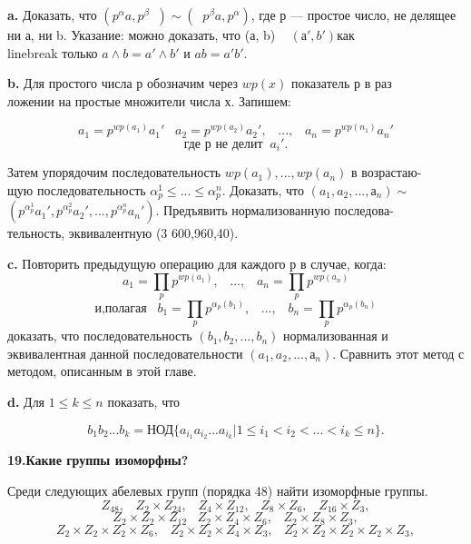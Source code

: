 {\bf a.} Доказать, что $ (p^{\alpha}a,p^{\beta}\;\;)\sim(\;\;p^{\beta}a,p^{\alpha}) $, где р — простое число, не 
делящее ни а, ни b. Указание: можно доказать, что (а, b) ~ $(а', b')$как\\linebreak 
только $a\wedge b = a'\wedge b'$ и $ab = a'b'$. 

\medskip


{\bf b.} Для простого числа р обозначим через $ wp(x)$ показатель р в 
раз\\ложении на простые множители числа х. Запишем: 


$$a_1=p^{ wp(a_1)}a_1'\;\;\;a_2=p^{ wp(a_2)}a_2',\;\;\;...,\;\;\;a_n=p^{ wp(n_1)}a_n'$$ 
$$\text{где р не делит}\;\;a_i'. $$



Затем упорядочим последовательность $ wp(a_1),..., wp(a_n)$ в 
возрастаю-\\
щую последовательность $ \alpha^1_p\leqslant...\leqslant\alpha^n_p $. Доказать, что $(a_1, a_2,..., а_n)\sim$\\
$(p^{\alpha_p^1}a_1',p^{\alpha_p^2}a_2',...,p^{\alpha_p^n}a_n') $. Предъявить нормализованную 
последова-\\тельность, эквивалентную (3 600,960,40). 

\medskip

{\bf c.} Повторить предыдущую операцию для каждого р в случае, когда: 
$$\displaystyle a_1=\prod_pp^{ wp(a_1)},\;\;\;...,\;\;\; a_n=\prod_p p^{ wp(a_n)}$$
$$\displaystyle \text{и,полагая}\;\;\;b_1=\prod_pp^{\alpha_p(b_1)},\;\;\;...,\;\;\; b_n=\prod_p p^{\alpha_p(b_n)} $$ 
доказать, что последовательность $(b_1, b_2,..., b_n)$ нормализованная и 
эквивалентная данной последовательности $(a_1, a_2,..., а_n)$. Сравнить 
этот метод с методом, описанным в этой главе. 

\medskip

{\bf d.} Для $1\leqslant k\leqslant n$ показать, что 

$$ b_1b_2... b_k = \text{НОД}\{a_{i_1}a_{i_2}... a_{i_k}|1\leqslant i_1<i_2<... <i_k\leqslant n\}. $$

\pagebreak

{\noindent\bf19.Какие группы изоморфны?} 


Среди следующих абелевых групп (порядка 48) найти изоморфные 
группы. 
$$Z_{48},\;\;\;Z_2 \times Z_{24},\;\;\;Z_4 \times Z_{12},\;\;\;Z_8 \times Z_6,\;\;\;Z_{16} \times Z_3, $$
$$Z_2 \times Z_2 \times Z_{12}\;\;\; Z_2 \times Z_4 \times Z_6,\;\;\;Z_2 \times Z_8 \times Z_3, $$
$$Z_2 \times Z_2 \times Z_2 \times Z_6,\;\;\;Z_2 \times Z_2 \times Z_4 \times Z_3,\;\;\; Z_2 \times Z_2 \times Z_2 \times Z_2 \times Z_3, $$


